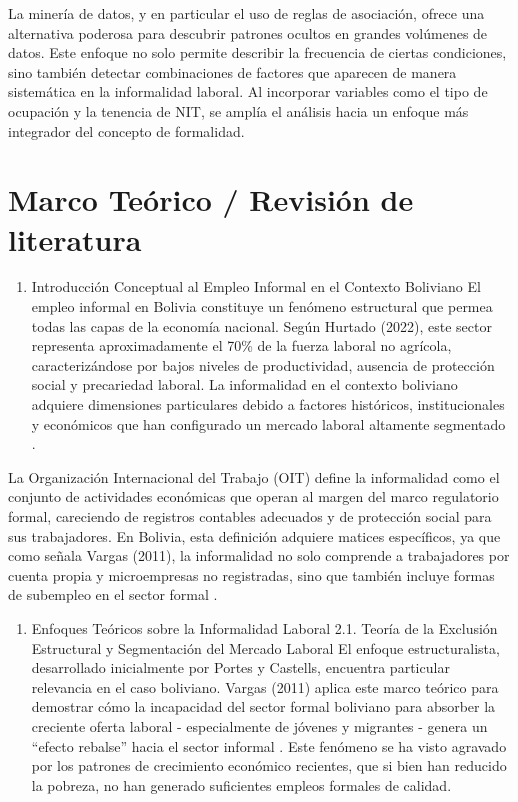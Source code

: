 \documentclass[Royal,times,sageh]{sagej}
\providecommand{\tightlist}{%
  \setlength{\itemsep}{0pt}\setlength{\parskip}{0pt}}
\begin{document}
La minería de datos, y en particular el uso de reglas de asociación,
ofrece una alternativa poderosa para descubrir patrones ocultos en
grandes volúmenes de datos. Este enfoque no solo permite describir la
frecuencia de ciertas condiciones, sino también detectar combinaciones
de factores que aparecen de manera sistemática en la informalidad
laboral. Al incorporar variables como el tipo de ocupación y la tenencia
de NIT, se amplía el análisis hacia un enfoque más integrador del
concepto de formalidad.

\section{Marco Teórico / Revisión de
literatura}\label{marco-teuxf3rico-revisiuxf3n-de-literatura}

\begin{enumerate}
\def\labelenumi{\arabic{enumi}.}
\tightlist
\item
  Introducción Conceptual al Empleo Informal en el Contexto Boliviano El
  empleo informal en Bolivia constituye un fenómeno estructural que
  permea todas las capas de la economía nacional. Según Hurtado (2022),
  este sector representa aproximadamente el 70\% de la fuerza laboral no
  agrícola, caracterizándose por bajos niveles de productividad,
  ausencia de protección social y precariedad laboral. La informalidad
  en el contexto boliviano adquiere dimensiones particulares debido a
  factores históricos, institucionales y económicos que han configurado
  un mercado laboral altamente segmentado \citep{hurtado2022rol}.
\end{enumerate}

La Organización Internacional del Trabajo (OIT) define la informalidad
como el conjunto de actividades económicas que operan al margen del
marco regulatorio formal, careciendo de registros contables adecuados y
de protección social para sus trabajadores. En Bolivia, esta definición
adquiere matices específicos, ya que como señala Vargas (2011), la
informalidad no solo comprende a trabajadores por cuenta propia y
microempresas no registradas, sino que también incluye formas de
subempleo en el sector formal \citep{vargas2011ser}.

\begin{enumerate}
\def\labelenumi{\arabic{enumi}.}
\setcounter{enumi}{1}
\tightlist
\item
  Enfoques Teóricos sobre la Informalidad Laboral 2.1. Teoría de la
  Exclusión Estructural y Segmentación del Mercado Laboral El enfoque
  estructuralista, desarrollado inicialmente por Portes y Castells,
  encuentra particular relevancia en el caso boliviano. Vargas (2011)
  aplica este marco teórico para demostrar cómo la incapacidad del
  sector formal boliviano para absorber la creciente oferta laboral -
  especialmente de jóvenes y migrantes - genera un ``efecto rebalse''
  hacia el sector informal \citep{vargas2011ser}. Este fenómeno se ha
  visto agravado por los patrones de crecimiento económico recientes,
  que si bien han reducido la pobreza, no han generado suficientes
  empleos formales de calidad.
\end{enumerate}
\end{document}
